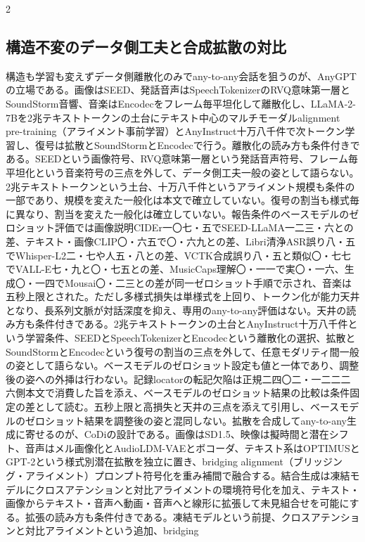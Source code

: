 \documentclass[lualatex,a4paper,10pt]{jlreq}
\begin{document}
\begin{multicols}{2}
\raggedcolumns
\subsection{構造不変のデータ側工夫と合成拡散の対比}
構造も学習も変えずデータ側離散化のみでany-to-any会話を狙うのが、AnyGPTの立場である。画像はSEED、発話音声はSpeechTokenizerのRVQ意味第一層とSoundStorm音響、音楽はEncodecをフレーム毎平坦化して離散化し、LLaMA-2-7Bを2兆テキストトークンの土台にテキスト中心のマルチモーダルalignment pre-training（アライメント事前学習）とAnyInstruct十万八千件で次トークン学習し、復号は拡散とSoundStormとEncodecで行う\autocite{btd096}。離散化の読み方も条件付きである。SEEDという画像符号、RVQ意味第一層という発話音声符号、フレーム毎平坦化という音楽符号の三点を外して、データ側工夫一般の姿として語らない。2兆テキストトークンという土台、十万八千件というアライメント規模も条件の一部であり、規模を変えた一般化は本文で確立していない。復号の割当も様式毎に異なり、割当を変えた一般化は確立していない\autocite{btd096}。報告条件のベースモデルのゼロショット評価では画像説明CIDEr一〇七・五でSEED-LLaMA一二三・六との差、テキスト・画像CLIP〇・六五で〇・六九との差、Libri清浄ASR誤り八・五でWhisper-L2二・七や人五・八との差、VCTK合成誤り八・五と類似〇・七七でVALL-E七・九と〇・七五との差、MusicCaps理解〇・一一で実〇・一六、生成〇・一四でMousai〇・二三との差が同一ゼロショット手順で示され、音楽は五秒上限とされた\autocite{btd096}。ただし多様式損失は単様式を上回り、トークン化が能力天井となり、長系列文脈が対話深度を抑え、専用のany-to-any評価はない\autocite{btd096}。天井の読み方も条件付きである。2兆テキストトークンの土台とAnyInstruct十万八千件という学習条件、SEEDとSpeechTokenizerとEncodecという離散化の選択、拡散とSoundStormとEncodecという復号の割当の三点を外して、任意モダリティ間一般の姿として語らない。ベースモデルのゼロショット設定も値と一体であり、調整後の姿への外挿は行わない\autocite{btd096}。記録locatorの転記欠陥は正規二四〇二・一二二二六側本文で消費した旨を添え、ベースモデルのゼロショット結果の比較は条件固定の差として読む。五秒上限と高損失と天井の三点を添えて引用し、ベースモデルのゼロショット結果を調整後の姿と混同しない。拡散を合成してany-to-any生成に寄せるのが、CoDiの設計である。画像はSD1.5、映像は擬時間と潜在シフト、音声はメル画像化とAudioLDM-VAEとボコーダ、テキスト系はOPTIMUSとGPT-2という様式別潜在拡散を独立に置き、bridging alignment（ブリッジング・アライメント）プロンプト符号化を重み補間で融合する。結合生成は凍結モデルにクロスアテンションと対比アライメントの環境符号化を加え、テキスト・画像からテキスト・音声へ動画・音声へと線形に拡張して未見組合せを可能にする\autocite{btd097}。拡張の読み方も条件付きである。凍結モデルという前提、クロスアテンションと対比アライメントという追加、bridging 
\end{multicols}
\end{document}
